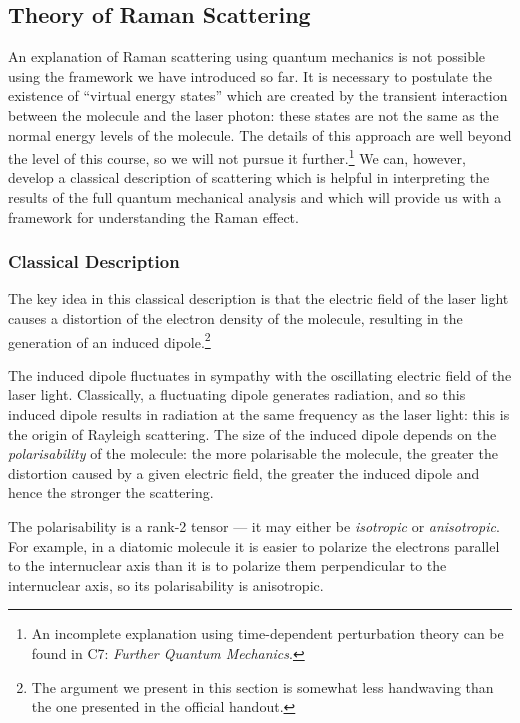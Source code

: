 \documentclass{article}
\theoremstyle{plain}\theoremheaderfont{\normalfont\itshape}\theorembodyfont{\rmfamily}\theoremseparator{.}\newtheorem*{rem}{Remark}\newtheorem*{ex}{Example}\newtheorem*{proof}{Proof}\newtheorem*{altp}{Alternative proof}
\theoremstyle{plain}\theoremheaderfont{\normalfont\bfseries}\theorembodyfont{\rmfamily}\theoremseparator{.}\newtheorem{thm}{Theorem}[section]\newtheorem{lem}[thm]{Lemma}\newtheorem{prop}[thm]{Proposition}\newtheorem*{cor}{Corollary}\newtheorem{defn}[thm]{Definition}\newtheorem{clm}[thm]{Claim}\newtheorem{clminproof}{Claim}\newtheorem{pos}{Postulate}[section]
\theoremstyle{break}\theoremheaderfont{\normalfont\itshape}\theorembodyfont{\rmfamily}\theoremseparator{.\medskip}\newtheorem*{proofskip}{Proof}\newtheorem*{exs}{Examples}\newtheorem*{rems}{Remarks}
\theoremstyle{break}\theoremheaderfont{\normalfont\bfseries}\theorembodyfont{\rmfamily}\theoremseparator{.\medskip}\newtheorem{lemskip}[thm]{Lemma}\newtheorem{defnskip}[thm]{Definition}\newtheorem{propskip}[thm]{Proposition}\newtheorem{thmskip}[thm]{Theorem}
\numberwithin{equation}{section}
\begin{document}
    \subsection{Theory of Raman Scattering}
    An explanation of Raman scattering using quantum mechanics is not possible using the framework we have introduced so far. It is necessary to postulate the existence of ``virtual energy states'' which are created by the transient interaction between the molecule and the laser photon: these states are not the same as the normal energy levels of the molecule. The details of this approach are well beyond the level of this course, so we will not pursue it further.\footnote{An incomplete explanation using time-dependent perturbation theory can be found in C7: \textit{Further Quantum Mechanics}.} We can, however, develop a classical description of scattering which is helpful in interpreting the results of the full quantum mechanical analysis and which will provide us with a framework for understanding the Raman effect.

    \subsubsection{Classical Description}
    The key idea in this classical description is that the electric field of the laser light causes a distortion of the electron density of the molecule, resulting in the generation of an induced dipole.\footnote{The argument we present in this section is somewhat less handwaving than the one presented in the official handout.}
    
    The induced dipole fluctuates in sympathy with the oscillating electric field of the laser light. Classically, a fluctuating dipole generates radiation, and so this induced dipole results in radiation at the same frequency as the laser light: this is the origin of Rayleigh scattering. The size of the induced dipole depends on the \textit{polarisability} of the molecule: the more polarisable the molecule, the greater the distortion caused by a given electric field, the greater the induced dipole and hence the stronger the scattering.
    
    The polarisability is a rank-2 tensor --- it may either be \textit{isotropic} or \textit{anisotropic}. For example, in a diatomic molecule it is easier to polarize the electrons parallel to the internuclear axis than it is to polarize them perpendicular to the internuclear axis, so its polarisability is anisotropic.
\end{document}
